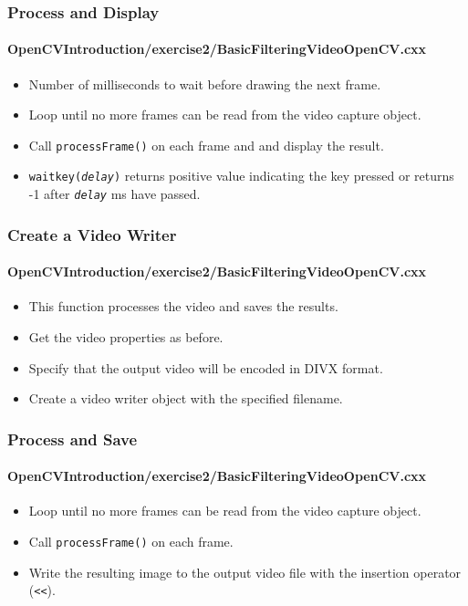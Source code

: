 \begin{frame}
\frametitle{Process and Display}
\framesubtitle{OpenCVIntroduction/exercise2/BasicFilteringVideoOpenCV.cxx}
\begin{center}
\begin{itemize}
\item Number of milliseconds to wait before drawing the next frame.
\item Loop until no more frames can be read from the video capture object.
\item Call {\tt\small processFrame()} on each frame and and display the result.
\item {\tt waitkey(\emph{delay})} returns positive value indicating the key pressed
      or returns -1 after {\tt \emph{delay}} ms have passed.
\end{itemize}
\end{center}
\end{frame}


\begin{frame}
\frametitle{Create a Video Writer}
\framesubtitle{OpenCVIntroduction/exercise2/BasicFilteringVideoOpenCV.cxx}
\begin{center}
\begin{itemize}
\item This function processes the video and saves the results.
\item Get the video properties as before.
\item Specify that the output video will be encoded in DIVX format.
\item Create a video writer object with the specified filename.
\end{itemize}
\end{center}
\end{frame}


\begin{frame}
\frametitle{Process and Save}
\framesubtitle{OpenCVIntroduction/exercise2/BasicFilteringVideoOpenCV.cxx}
\begin{center}
\begin{itemize}
\item Loop until no more frames can be read from the video capture object.
\item Call {\tt\small processFrame()} on each frame.
\item Write the resulting image to the output video file with the insertion operator ({\tt\small <<}).
\end{itemize}
\end{center}
\end{frame}



